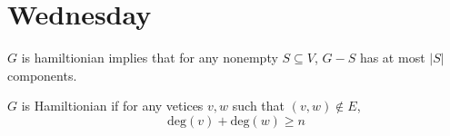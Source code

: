 \section{Wednesday}

\begin{proposition}
$G$ is hamiltionian implies that for any nonempty $S\subseteq V$, $G-S$ has at most $|S|$ components.
\end{proposition}
\begin{theorem}
$G$ is Hamiltionian if for any vetices $v,w$ such that $(v,w)\notin E$,
\[
\mbox{deg}(v)+\mbox{deg}(w)\ge n
\]
\end{theorem}

